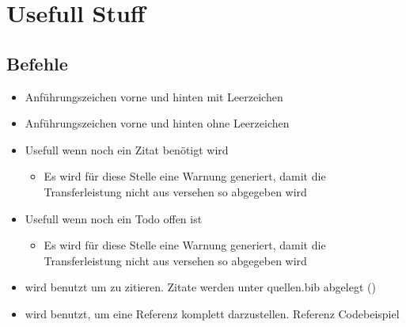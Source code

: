 \section{Usefull Stuff}

\subsection{Befehle}
\begin{itemize}
    \item {} Anführungszeichen vorne und hinten mit Leerzeichen
    \item {} Anführungszeichen vorne und hinten ohne Leerzeichen
    \item {} Usefull wenn noch ein Zitat benötigt wird
    \begin{itemize} 
        \item Es wird für diese Stelle eine Warnung generiert, damit die Transferleistung nicht aus versehen so abgegeben wird
    \end{itemize}
    \item {} Usefull wenn noch ein Todo offen ist
    \begin{itemize} 
        \item Es wird für diese Stelle eine Warnung generiert, damit die Transferleistung nicht aus versehen so abgegeben wird
    \end{itemize}
    \item {} wird benutzt um zu zitieren. Zitate werden unter quellen.bib abgelegt (\cite{OOPOverview})
    \item {} wird benutzt, um eine Referenz komplett darzustellen. Referenz Codebeispiel 
\end{itemize}